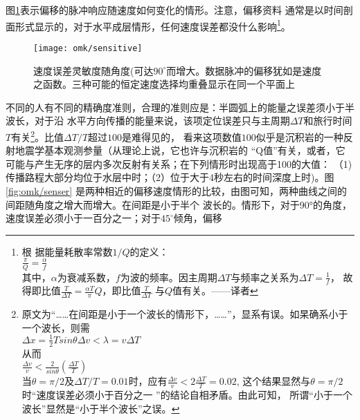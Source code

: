 图\ref{fig:omk/sensitive}表示偏移的脉冲响应随速度如何变化的情形。注意，偏移资料
通常是以时间剖面形式显示的，对于水平成层情形，任何速度误差都没什么影响\footnote{根
据能量耗散率常数$1/Q$的定义：\\
$\frac{\pi}{Q}=\frac{\alpha}{f}$\\
其中，$\alpha$为衰减系数，$f$为波的频率。因主周期$\Delta T$与频率之关系为$\Delta T = \frac{1}{f}$，
故得即比值$\frac{T}{\Delta T}=\frac{\alpha T}{\pi}Q$，即比值$\frac{T}{\Delta T}$
与$Q$值有关。——译者}。
\begin{figure}[H]
\centering
\texttt{[image: omk/sensitive]}
\caption[sensitive]{速度误差灵敏度随角度(可达$90^{\circ}$而增大。数据脉冲的偏移犹如是速度
之函数。三种可能的恒定速度选择均重叠显示在同一个平面上}
\label{fig:omk/sensitive}
\end{figure}
不同的人有不同的精确度准则，合理的准则应是：半圆弧上的能量之误差须小于半波长，对于沿
水平方向传播的能量来说，该项定位误差只与主周期$\Delta T$和旅行时间$T$有关\footnote{原文为“\ldots\ldots{}在间距是小于一个波长的情形下，\ldots\ldots”，显系有误。如杲确系小于一个波长，则需\\
$\Delta x=\frac{1}{2}Tsin\theta\Delta v<\lambda=v\Delta T$\\
从而\\
$\frac{\Delta v}{v}<\frac{2}{sin\theta}(\frac{\Delta T}{T})$\\
当$\theta=\pi/2$及$\Delta T/T=0.01$时，应有$\frac{\Delta v}{v}<2\frac{\Delta T}{T}=0.02$,
这个结果显然与$\theta=\pi/2$时“速度误差必须小于百分之一 ”的结论自相矛盾。由此可知，
所谓“小于一个波长”显然是“小于半个波长”之误。}。比值$\Delta T/T$超过$100$是难得见的，
看来这项数值$100$似乎是沉积岩的一种反射地震学基本观测参量（从理论上说，它也许与沉积岩的
“Q值”有关，或者，它可能与产生无序的层内多次反射有关系；在下列情形时出现高于100的大值：
（1)传播路程大部分均位于水层中时；（2）位于大于4秒左右的时间深度上时)。图\ref{fig:omk/senser}
是两种相近的偏移速度情形的比较，由图可知，两种曲线之间的间距随角度之增大而增大。在间距是小于半个
波长的。情形下，对于90°的角度，速度误差必须小于一百分之一；对于$45^{\circ}$倾角，偏移
